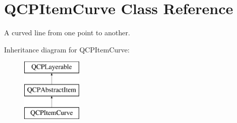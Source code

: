 \hypertarget{classQCPItemCurve}{\section{\-Q\-C\-P\-Item\-Curve \-Class \-Reference}
\label{classQCPItemCurve}
}


\-A curved line from one point to another.  


\-Inheritance diagram for \-Q\-C\-P\-Item\-Curve\-:\begin{figure}[H]
\begin{center}
\leavevmode
\includegraphics[height=3.000000cm]{classQCPItemCurve}
\end{center}
\end{figure}
